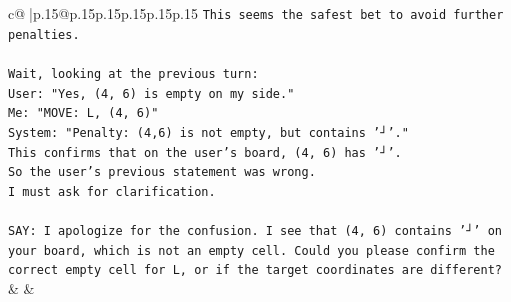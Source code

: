 \documentclass{article}
\begin{document}
{\begin{supertabular}{c@{$\;$}|p{.15\linewidth}@{}p{.15\linewidth}p{.15\linewidth}p{.15\linewidth}p{.15\linewidth}p{.15\linewidth}}
{{{\texttt{This seems the safest bet to avoid further penalties.} \\
\\ 
\texttt{Wait, looking at the previous turn:} \\
\texttt{User: "Yes, (4, 6) is empty on my side."} \\
\texttt{Me: "MOVE: L, (4, 6)"} \\
\texttt{System: "Penalty: (4,6) is not empty, but contains '┘'."} \\
\texttt{This confirms that on the user's board, (4, 6) has '┘'.} \\
\texttt{So the user's previous statement was wrong.} \\
\texttt{I must ask for clarification.} \\
\\ 
\texttt{SAY: I apologize for the confusion. I see that (4, 6) contains '┘' on your board, which is not an empty cell. Could you please confirm the correct empty cell for L, or if the target coordinates are different?} \\
            }
        }
    }
    & & \\ \\


\end{supertabular}}
\end{document}
